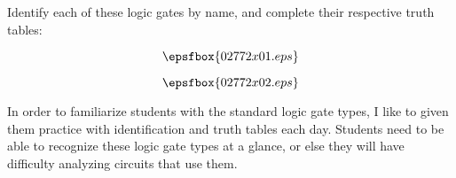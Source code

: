 

Identify each of these logic gates by name, and complete their respective truth tables:

$$\epsfbox{02772x01.eps}$$







$$\epsfbox{02772x02.eps}$$







In order to familiarize students with the standard logic gate types, I like to given them practice with identification and truth tables each day.  Students need to be able to recognize these logic gate types at a glance, or else they will have difficulty analyzing circuits that use them.




